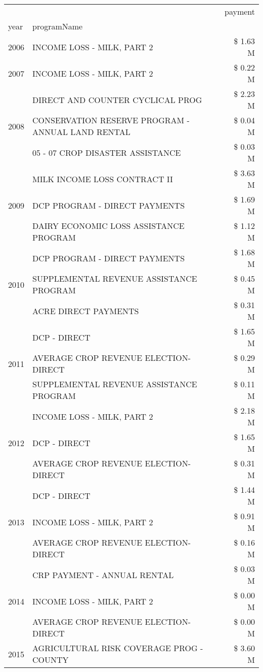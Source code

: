 \begin{tabular}{llr}
\toprule
 &  & payment \\
year & programName &  \\
\midrule
2006 & INCOME LOSS - MILK, PART 2 & \$ 1.63 M \\
\cline{1-3}
2007 & INCOME LOSS - MILK, PART 2 & \$ 0.22 M \\
\cline{1-3}
\multirow[t]{3}{*}{2008} & DIRECT AND COUNTER CYCLICAL PROG & \$ 2.23 M \\
 & CONSERVATION RESERVE PROGRAM - ANNUAL LAND RENTAL & \$ 0.04 M \\
 & 05 - 07 CROP DISASTER ASSISTANCE & \$ 0.03 M \\
\cline{1-3}
\multirow[t]{3}{*}{2009} & MILK INCOME LOSS CONTRACT II & \$ 3.63 M \\
 & DCP PROGRAM - DIRECT PAYMENTS & \$ 1.69 M \\
 & DAIRY ECONOMIC LOSS ASSISTANCE PROGRAM & \$ 1.12 M \\
\cline{1-3}
\multirow[t]{3}{*}{2010} & DCP PROGRAM - DIRECT PAYMENTS & \$ 1.68 M \\
 & SUPPLEMENTAL REVENUE ASSISTANCE PROGRAM & \$ 0.45 M \\
 & ACRE DIRECT PAYMENTS & \$ 0.31 M \\
\cline{1-3}
\multirow[t]{3}{*}{2011} & DCP - DIRECT & \$ 1.65 M \\
 & AVERAGE CROP REVENUE ELECTION-DIRECT & \$ 0.29 M \\
 & SUPPLEMENTAL REVENUE ASSISTANCE PROGRAM & \$ 0.11 M \\
\cline{1-3}
\multirow[t]{3}{*}{2012} & INCOME LOSS - MILK, PART 2 & \$ 2.18 M \\
 & DCP - DIRECT & \$ 1.65 M \\
 & AVERAGE CROP REVENUE ELECTION-DIRECT & \$ 0.31 M \\
\cline{1-3}
\multirow[t]{3}{*}{2013} & DCP - DIRECT & \$ 1.44 M \\
 & INCOME LOSS - MILK, PART 2 & \$ 0.91 M \\
 & AVERAGE CROP REVENUE ELECTION-DIRECT & \$ 0.16 M \\
\cline{1-3}
\multirow[t]{3}{*}{2014} & CRP PAYMENT - ANNUAL RENTAL & \$ 0.03 M \\
 & INCOME LOSS - MILK, PART 2 & \$ 0.00 M \\
 & AVERAGE CROP REVENUE ELECTION-DIRECT & \$ 0.00 M \\
\cline{1-3}
\multirow[t]{3}{*}{2015} & AGRICULTURAL RISK COVERAGE PROG - COUNTY & \$ 3.60 M \\

\end{tabular}
